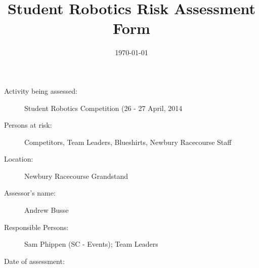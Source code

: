 \documentclass[12pt,a4paper]{scrartcl}
\title{Student Robotics Risk Assessment Form}
\begin{document}
\maketitle

\begin{description}
\item[Activity being assessed:] Student Robotics Competition (26 - 27 April, 2014
\item[Persons at risk:] Competitors, Team Leaders, Blueshirts, Newbury Racecourse Staff
\item[Location:] Newbury Racecourse Grandstand
\end{description}

\begin{description}
\item[Assessor's name:] Andrew Busse
\item[Responsible Persons:] Sam Phippen (SC - Events); Team Leaders
\item[Date of assessment:] \date{\today}
\end{description}
\clearpage

\newcommand{\risk}[4]{
 #1 & #2 & #3 & #4 \\
}
\end{document}
